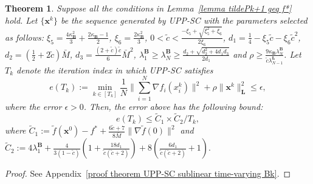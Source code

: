 \documentclass[10pt,a4paper]{amsart}
\newtheorem{theorem}{Theorem}
\begin{document}
\begin{theorem}\label{theorem UPP-SC sublinear time-varying Bk}
	Suppose all the conditions in Lemma~\ref{lemma tildePk+1 geq f*} hold. Let $\{\mathbf{x}^k\}$ be the sequence generated by UPP-SC with the parameters selected as follows: $\xi_5=\frac{4\kappa_{\mathbf{B}}^2}{3}+\frac{2\kappa_{\mathbf{B}}-1}{2}$, $\xi_6= \frac{2\kappa_{\mathbf{B}}^2}{3}$, $0<\tilde{c}<\frac{-\xi_5+\sqrt{\xi_5^2+\xi_6}}{2\xi_6}$, $d_1= \frac{1}{4}- \xi_5 \tilde{c}-\xi_6 \tilde{c}^2$, $d_2 = (\frac{1}{2}+2\tilde{c})\bar{M}$, $d_3=\frac{(2+\tilde{c})\tilde{c}}{6}\bar{M}^2$, $\lambda_1^{\mathbf{B}}\geq\lambda_N^{\mathbf{B}}\geq \frac{d_2+\sqrt{d_2^2+4d_1d_3}}{2d_1}$ and $\rho \geq \frac{9\kappa_{\mathbf{B}}\lambda_N^{\mathbf{B}}}{\tilde{c}\lambda_{N-1}^{\mathbf{L}}}$.
	Let $T_k$ denote the iteration index in which UPP-SC satisfies
	\begin{equation}
		e(T_k):= \min_{k\in[T_k]}\frac{1}{N}\|\sum_{i=1}^N \nabla {f}_i(x_i^k)\|^2+\rho\|\mathbf{x}^{k}\|^2_\mathbf{L}\leq \epsilon, \label{eT time-varying Bk}
	\end{equation}
	where the error $\epsilon>0$. Then, the error above has the following bound:
	\begin{equation}
		e(T_k) \leq \tilde{C}_1\times {\tilde{C}_2}/{T_k}, \label{epsilon leq tildeC1C2/T}
	\end{equation}
	where $\tilde{C}_1:= \tilde{f}(\mathbf{x}^0)-f^*+\frac{6\tilde{c}+7}{8\bar{M}}\|\nabla \tilde{f}(0)\|^2$ and $\tilde{C}_2:= 4{\lambda}_1^{\mathbf{B}}+\frac{4}{3(1-\tilde{c})}(1+\frac{18d_1}{\tilde{c}(\tilde{c}+2)})+8(\frac{6d_1}{\tilde{c}(\tilde{c}+2)}+1).$
\end{theorem}

\begin{proof}
    See Appendix~\ref{proof theorem UPP-SC sublinear time-varying Bk}.
\end{proof}
\end{document}
